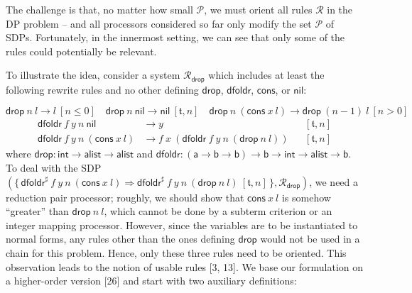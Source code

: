  
 
The challenge is that, no matter how small $\mathcal{P}$, we must orient all rules $\mathcal{R}$ in the DP problem – and all processors considered so far only modify the set $\mathcal{P}$ of SDPs. Fortunately, in the innermost setting, we can see that only some of the rules could potentially be relevant.\par
 
 
 
To illustrate the idea, consider a system $\mathcal{R}_{\mathsf{drop}}$ which includes at least the following rewrite rules and no other defining $\mathsf{drop}$, $\mathsf{dfoldr}$, $\mathsf{cons}$, or $\mathsf{nil}$:\par
    \[\displaystyle{{{\mathsf{drop}}\ {n}}\ {l}}\rightarrow{l}\ [n\leq 0]\quad{{{\mathsf{drop}}\ {n}}\ {\mathsf{nil}}}\rightarrow{\mathsf{nil}}\ [\mathfrak{t},n]\quad{{{\mathsf{drop}}\ {n}}\ {({{\mathsf{cons}}\ {x}}\ {l})}}\rightarrow{{{\mathsf{drop}}\ {(n-1)}}\ {l}}\ [n>0]\]     \[\displaystyle\begin{aligned} {{{{\mathsf{dfoldr}}\ {f}}\ {y}}\ {n}}\ {\mathsf{nil}}&\rightarrow y&&[\mathfrak{t},n]\\
{{{{\mathsf{dfoldr}}\ {f}}\ {y}}\ {n}}\ {({{\mathsf{cons}}\ {x}}\ {l})}&\rightarrow{{f}\ {x}}\ {({{{{\mathsf{dfoldr}}\ {f}}\ {y}}\ {n}}\ {({{\mathsf{drop}}\ {n}}\ {l})})}&&[\mathfrak{t},n]\end{aligned}\]    
where $\mathsf{drop}:\mathsf{int}\rightarrow\mathsf{alist}\rightarrow\mathsf{alist}$ and $\mathsf{dfoldr}:(\mathsf{a}\rightarrow\mathsf{b}\rightarrow\mathsf{b})\rightarrow\mathsf{b}\rightarrow\mathsf{int}\rightarrow\mathsf{alist}\rightarrow\mathsf{b}$. To deal with the SDP $(\{\,{{{{{\mathsf{dfoldr}^{\sharp}}\ {f}}\ {y}}\ {n}}\ {({{\mathsf{cons}}\ {x}}\ {l})}}\Rightarrow{{{{{\mathsf{dfoldr}^{\sharp}}\ {f}}\ {y}}\ {n}}\ {({{\mathsf{drop}}\ {n}}\ {l})}}\ [\mathfrak{t},n]\,\},\mathcal{R}_{\mathsf{drop}})$, we need a reduction pair processor; roughly, we should show that ${{\mathsf{cons}}\ {x}}\ {l}$ is somehow “greater” than ${{\mathsf{drop}}\ {n}}\ {l}$, which cannot be done by a subterm criterion or an integer mapping processor. However, since the variables are to be instantiated to normal forms, any rules other than the ones defining $\mathsf{drop}$ would not be used in a chain for this problem. Hence, only these three rules need to be oriented. This observation leads to the notion of usable rules [3, 13]. We base our formulation on a higher-order version [26] and start with two auxiliary definitions:\par
 
